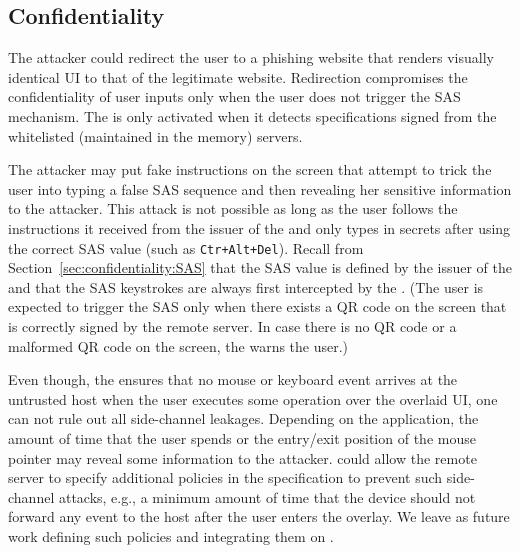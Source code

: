 \subsection{Confidentiality}
\label{sec:securityAnalysis:confidentiality}

 The attacker could redirect the user to a phishing website that renders visually identical UI to that of the legitimate website. Redirection compromises the confidentiality of user inputs only when the user does not trigger the SAS mechanism. The \device is only activated when it detects specifications signed from the whitelisted (maintained in the memory) servers.


 The attacker may put fake instructions on the screen that attempt to trick the user into typing a false SAS sequence and then revealing her sensitive information to the attacker. This attack is not possible as long as the user follows the instructions it received from the issuer of the \device and only types in secrets after using the correct SAS value (such as \texttt{Ctr+Alt+Del}). Recall from Section~\ref{sec:confidentiality:SAS} that the SAS value is defined by the issuer of the \device and that the SAS keystrokes are always first intercepted by the \device. (The user is expected to trigger the SAS only when there exists a QR code on the screen that is correctly signed by the remote server. In case there is no QR code or a malformed QR code on the screen, the \device warns the user.)


 Even though, the \device ensures that no mouse or keyboard event arrives at the untrusted host when the user executes some operation over the overlaid UI, one can not rule out all side-channel leakages. Depending on the application, the amount of time that the user spends or the entry/exit position of the mouse pointer may reveal some information to the attacker. 
\device could allow the remote server to specify additional policies in the specification to prevent such side-channel attacks, e.g., a minimum amount of time that the device should not forward any event to the host after the user enters the overlay. We leave as future work defining such policies and integrating them on \name.


